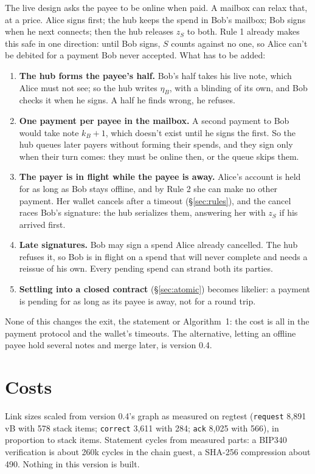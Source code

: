 \documentclass[11pt]{article}
\theoremstyle{plain}
\theoremstyle{definition}
\newcommand{\tx}[1]{\texttt{#1}}
\begin{document}
The live design asks the payee to be online when paid. A mailbox can
relax that, at a price. Alice signs first; the hub keeps the spend in
Bob's mailbox; Bob signs when he next connects; then the hub releases
$z_S$ to both. Rule 1 already makes this safe in one direction: until
Bob signs, $S$ counts against no one, so Alice can't be debited for a
payment Bob never accepted. What has to be added:

\begin{enumerate}[nosep]
\item \textbf{The hub forms the payee's half.} Bob's half takes his live
  note, which Alice must not see; so the hub writes $\eta_B$, with a
  blinding of its own, and Bob checks it when he signs. A half he finds
  wrong, he refuses.
\item \textbf{One payment per payee in the mailbox.} A second payment to
  Bob would take note $k_B + 1$, which doesn't exist until he signs the
  first. So the hub queues later payers without forming their spends,
  and they sign only when their turn comes: they must be online then,
  or the queue skips them.
\item \textbf{The payer is in flight while the payee is away.} Alice's
  account is held for as long as Bob stays offline, and by Rule 2 she
  can make no other payment. Her wallet cancels after a timeout
  (\S\ref{sec:rules}), and the cancel races Bob's signature: the hub
  serializes them, answering her with $z_S$ if his arrived first.
\item \textbf{Late signatures.} Bob may sign a spend Alice already
  cancelled. The hub refuses it, so Bob is in flight on a spend that
  will never complete and needs a reissue of his own. Every pending
  spend can strand both its parties.
\item \textbf{Settling into a closed contract} (\S\ref{sec:atomic})
  becomes likelier: a payment is pending for as long as its payee is
  away, not for a round trip.
\end{enumerate}

None of this changes the exit, the statement or Algorithm~1: the cost is
all in the payment protocol and the wallet's timeouts. The alternative,
letting an offline payee hold several notes and merge later, is version
0.4.

\section{Costs}\label{sec:costs}

Link sizes scaled from version 0.4's graph as measured on regtest
(\tx{request} 8,891 vB with 578 stack items; \tx{correct} 3,611 with
284; \tx{ack} 8,025 with 566), in proportion to stack items. Statement
cycles from measured parts: a BIP340 verification is about 260k cycles
in the chain guest, a SHA-256 compression about 490. Nothing in this
version is built.
\end{document}
